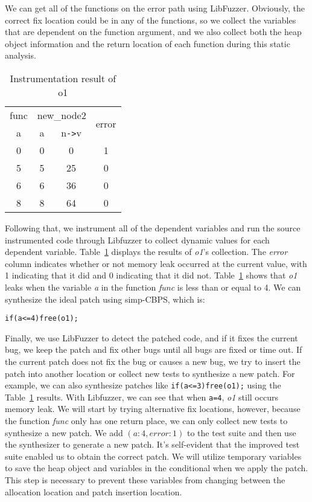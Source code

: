 \documentclass[a4paper,11pt,oneside,openany]{book}
\begin{document}
We can get all of the functions on the error path using LibFuzzer. Obviously, the correct fix location could be in any of the functions, so we collect the variables that are dependent on the function argument, and we also collect both the heap object information and the return location of each function during this static analysis. 

\begin{table}[h]
  \caption{Instrumentation result of o1}
  \label{instres}
  \centering
  \begin{tabular}{|c|c|c|c|}
    \hline
    func  & \multicolumn{2}{|c|}{new\_node2} & \multirow{2}{*}{error} \\
    \cline{1-3}
    a & a & n\verb|->|v &\\
    \hline
     0 & 0  & 0 & 1\\
     5 & 5  & 25 & 0\\
     6 & 6  & 36 & 0\\
     8 & 8  & 64 & 0\\
    \hline
  \end{tabular}
\end{table}

Following that, we instrument all of the dependent variables and run the source instrumented code through Libfuzzer to collect dynamic values for each dependent variable. Table~\ref{instres} displays the results of {\it o1}'s collection. The {\it error} column indicates whether or not memory leak occurred at the current value, with 1 indicating that it did and 0 indicating that it did not. Table~\ref{instres} shows that {\it o1} leaks when the variable {\it a} in the function {\it func} is less than or equal to 4. We can synthesize the ideal patch using simp-CBPS, which is:

\begin{minipage}{\textwidth}
\vspace{0.2cm}
\hspace{0.3cm}
\raggedright
\verb|if(a<=4)free(o1);|
\label{patch1}
\vspace{0.2cm}
\end{minipage}

Finally, we use LibFuzzer to detect the patched code, and if it fixes the current bug, we keep the patch and fix other bugs until all bugs are fixed or time out. If the current patch does not fix the bug or causes a new bug, we try to insert the patch into another location or collect new tests to synthesize a new patch. For example, we can also synthesize patches like \verb|if(a<=3)free(o1);| using the Table~\ref{instres} results. With Libfuzzer, we can see that when \verb|a=4|, {\it o1} still occurs memory leak. We will start by trying alternative fix locations, however, because the function {\it func} only has one return place, we can only collect new tests to synthesize a new patch. We add $(a:4, error:1)$ to the test suite and then use the synthesizer to generate a new patch. It's self-evident that the improved test suite enabled us to obtain the correct patch. We will utilize temporary variables to save the heap object and variables in the conditional when we apply the patch. This step is necessary to prevent these variables from changing between the allocation location and patch insertion location.
\end{document}
